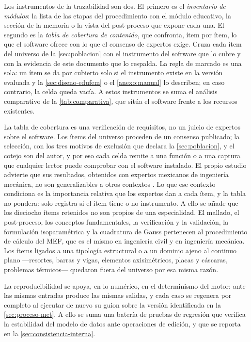 Los instrumentos de la trazabilidad son dos. El primero es el \emph{inventario de módulos}: la lista de las etapas del procedimiento con el módulo educativo, la sección de la memoria o la vista del post-proceso que expone cada una. El segundo es la \emph{tabla de cobertura de contenido}, que confronta, ítem por ítem, lo que el software ofrece con lo que el consenso de expertos exige. Cruza cada ítem del universo de la \autoref{sec:poblacion} con el instrumento del software que lo cubre y con la evidencia de este documento que lo respalda. La regla de marcado es una sola: un ítem se da por cubierto solo si el instrumento existe en la versión evaluada y la \autoref{sec:diseno-edufem} o el \autoref{anexo:manual} lo describen; en caso contrario, la celda queda vacía. A estos instrumentos se suma el análisis comparativo de la \autoref{tab:comparativa}, que sitúa el software frente a los recursos existentes.

La tabla de cobertura es una verificación de requisitos, no un juicio de expertos sobre el software. Los ítems del universo proceden de un consenso publicado; la selección, con los tres motivos de exclusión que declara la \autoref{sec:poblacion}, y el cotejo son del autor, y por eso cada celda remite a una función o a una captura que cualquier lector puede comprobar con el software instalado. El propio estudio advierte que sus resultados, obtenidos con expertos mexicanos de ingeniería mecánica, no son generalizables a otros contextos \autocite[p.~1171]{perezsantiago2023fem}. Lo que ese contexto condiciona es la importancia relativa que los expertos dan a cada ítem, y la tabla no pondera: solo registra si el ítem tiene o no instrumento. A ello se añade que los dieciocho ítems retenidos no son propios de una especialidad. El mallado, el post-proceso, los conceptos fundamentales, la verificación y la validación, la formulación isoparamétrica y la cuadratura de Gauss pertenecen al procedimiento de cálculo del MEF, que es el mismo en ingeniería civil y en ingeniería mecánica. Los ítems ligados a una tipología estructural o a un dominio ajeno al continuo plano —resortes, barras y vigas, elementos axisimétricos, placas y cáscaras, problemas térmicos— quedaron fuera del universo por esa misma razón.

La reproducibilidad se apoya, en lo numérico, en el determinismo del motor: ante las mismas entradas produce las mismas salidas, y cada caso se regenera por completo al ejecutar de nuevo su guion sobre la versión identificada en la \autoref{sec:proceso-met}. A ello se suma una batería de pruebas de regresión que verifica la estabilidad del modelo de datos ante operaciones de edición, y que se reporta en la \autoref{sec:consistencia-interna}.


